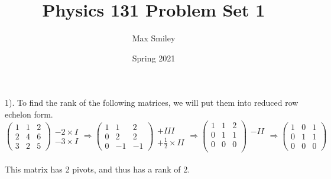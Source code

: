 \documentclass[12pt]{article}
\begin{document}
\title{Physics 131 Problem Set 1}
\author{Max Smiley}
\date{Spring 2021}
\maketitle

1). To find the rank of the following matrices, we will put them into reduced row echelon form. 
$$\begin{pmatrix}
1 & 1 & 2 \\
2 & 4 & 6 \\
3 & 2 & 5
\end{pmatrix} 
\begin{matrix}
\\
-2 \times I \\ 
-3 \times I \\
\end{matrix}
\Rightarrow
\begin{pmatrix}
1 & 1 & 2 \\
0 & 2 & 2 \\
0 & -1 & -1
\end{pmatrix}
\begin{matrix}
\\
+ III\\
+ \frac{1}{2} \times II
\end{matrix}
\Rightarrow
\begin{pmatrix}
1 & 1 & 2\\
0 & 1 & 1\\
0 & 0 & 0\\
\end{pmatrix}
\begin{matrix}
- II\\
\\
\\
\end{matrix}
\Rightarrow
\begin{pmatrix}
1 & 0 & 1\\
0 & 1 & 1\\
0 & 0 & 0
\end{pmatrix}
$$\\
This matrix has 2 pivots, and thus has a rank of 2.
\end{document}

